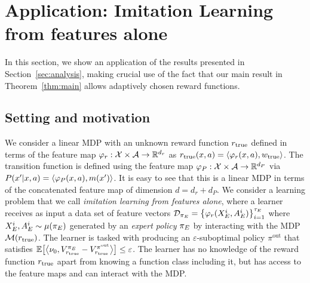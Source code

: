 
\section{Application: Imitation Learning from features alone}
\label{sec:application}

In this section, we show an application of the results presented in Section~\ref{sec:analysis}, making crucial use of 
the fact that our main result in Theorem~\ref{thm:main} allows adaptively chosen reward functions. 

\subsection{Setting and motivation}

We consider a linear MDP with an unknown reward function $r_{\textup{true}}$ defined in terms of the feature map 
$\varphi_r:\mathcal{X}\times\mathcal{A}\rightarrow\mathbb{R}^{d_r}$ as $r_{\textup{true}}(x,a) = \left\langle{\varphi_r(x,a)},{w_{\mathrm{true}}}\right\rangle$. The transition 
function is defined using the feature map $\varphi_P: \mathcal{X}\times\mathcal{A}\rightarrow\mathbb{R}^{d_P}$ via $P(x'|x,a)=\left\langle{\varphi_P(x,a)},{ 
m(x')}\right\rangle$. It is easy to see that this is a linear MDP in terms of the concatenated feature map of dimension $d = d_r + 
d_P$. We consider a learning problem that we call \emph{imitation learning from features alone}, where a learner 
receives as input a data set of feature vectors $\mathcal{D}_{\pi_E} = \left\{{\varphi_{r}(X^i_E,A^i_E)}\right\}^{\tau_E}_{i=1}$ 
where $X^i_E,A^i_E \sim \mu({\pi_E})$ generated by an \emph{expert policy} ${\pi_E}$ by interacting with the MDP 
$\mathcal{M}(r_{\textup{true}})$. The learner is tasked with producing an $\varepsilon$-suboptimal policy $\pi^{\mathrm{out}}$ that 
satisfies $\mathbb{E}\bigl[\bigl\langle\nu_0,V_{r_{\textup{true}}}^{{\pi_E}} - V_{r_{\textup{true}}}^{\pi^{\mathrm{out}}}\bigr\rangle\bigr] \leq 
\varepsilon$. The learner has no knowledge of the reward function $r_{\textup{true}}$ apart from knowing a function class including 
it, but has access to the feature maps and can interact with the MDP.

